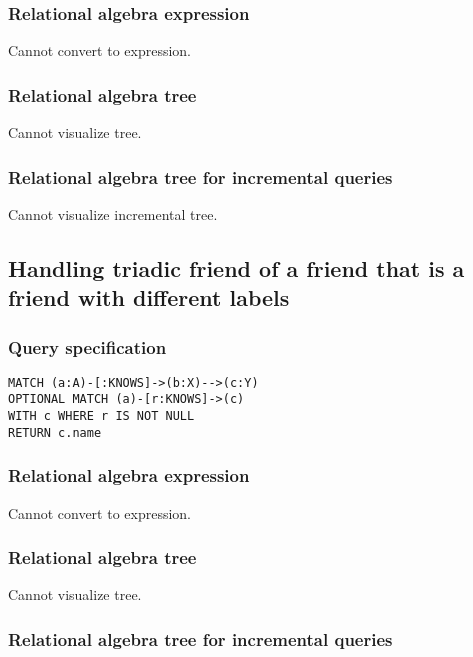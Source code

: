 \subsubsection*{Relational algebra expression}

Cannot convert to expression.

\subsubsection*{Relational algebra tree}

Cannot visualize tree.

\subsubsection*{Relational algebra tree for incremental queries}

Cannot visualize incremental tree.

\subsection{Handling triadic friend of a friend that is a friend with different labels}

\subsubsection*{Query specification}

\begin{lstlisting}
MATCH (a:A)-[:KNOWS]->(b:X)-->(c:Y)
OPTIONAL MATCH (a)-[r:KNOWS]->(c)
WITH c WHERE r IS NOT NULL
RETURN c.name
\end{lstlisting}

\subsubsection*{Relational algebra expression}

Cannot convert to expression.

\subsubsection*{Relational algebra tree}

Cannot visualize tree.

\subsubsection*{Relational algebra tree for incremental queries}


